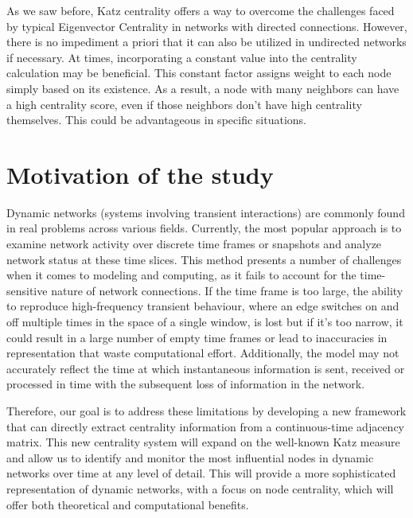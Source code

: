 As we saw before, Katz centrality offers a way to overcome the challenges faced by typical Eigenvector Centrality in networks with directed connections. However, there is no impediment a priori that it can also be utilized in undirected networks if necessary. At times, incorporating a constant value into the centrality calculation may be beneficial. This constant factor assigns weight to each node simply based on its existence. As a result, a node with many neighbors can have a high centrality score, even if those neighbors don't have high centrality themselves. This could be advantageous in specific situations.

\section{Motivation of the study}
\label{sec:motiv}
Dynamic networks (systems involving transient interactions) are commonly found in real problems across various fields. Currently, the most popular approach is to examine network activity over discrete time frames or snapshots and analyze network status at these time slices. This method presents a number of challenges when it comes to modeling and computing, as it fails to account for the time-sensitive nature of network connections. If the time frame is too large, the ability to reproduce high-frequency transient behaviour, where an
edge switches on and off multiple times in the space of a single window, is lost but if it's too narrow, it could result in a large number of empty time frames or lead to inaccuracies in representation that waste computational
effort. Additionally, the model may not accurately reflect the time at which instantaneous information is sent, received or processed in time with the subsequent loss of information in the network.

Therefore, our goal is to address these limitations by developing a new framework that can directly extract centrality information from a continuous-time adjacency matrix. This new centrality system will expand on the well-known Katz measure and allow us to identify and monitor the most influential nodes in dynamic networks over time at any level of detail. This will provide a more sophisticated representation of dynamic networks, with a focus on node centrality, which will offer both theoretical and computational benefits.

